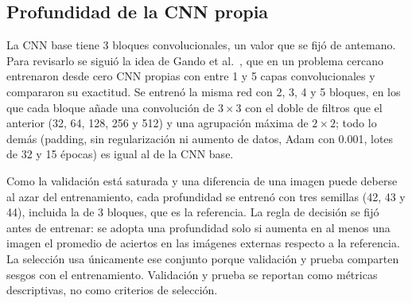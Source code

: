 \documentclass[letterpaper, 10 pt]{IEEEconf}
\begin{document}
\subsection{Profundidad de la CNN propia}
\label{sec:profundidad_cnn}

La CNN base tiene 3 bloques convolucionales, un valor que se fijó de antemano. Para revisarlo se siguió la idea de Gando et al.~\cite{gando}, que en un problema cercano entrenaron desde cero CNN propias con entre 1 y 5 capas convolucionales y compararon su exactitud. Se entrenó la misma red con 2, 3, 4 y 5 bloques, en los que cada bloque añade una convolución de $3 \times 3$ con el doble de filtros que el anterior (32, 64, 128, 256 y 512) y una agrupación máxima de $2 \times 2$; todo lo demás (padding, sin regularización ni aumento de datos, Adam con 0.001, lotes de 32 y 15 épocas) es igual al de la CNN base.

Como la validación está saturada y una diferencia de una imagen puede deberse al azar del entrenamiento, cada profundidad se entrenó con tres semillas (42, 43 y 44), incluida la de 3 bloques, que es la referencia. La regla de decisión se fijó antes de entrenar: se adopta una profundidad solo si aumenta en al menos una imagen el promedio de aciertos en las imágenes externas respecto a la referencia. La selección usa únicamente ese conjunto porque validación y prueba comparten sesgos con el entrenamiento. Validación y prueba se reportan como métricas descriptivas, no como criterios de selección.

\begin{table}[H]
\caption{Comparación de profundidades de la CNN propia (media y desviación estándar sobre 3 semillas)}
\label{tab:profundidad_cnn}
\centering
\footnotesize
{}
\end{table}
\end{document}
